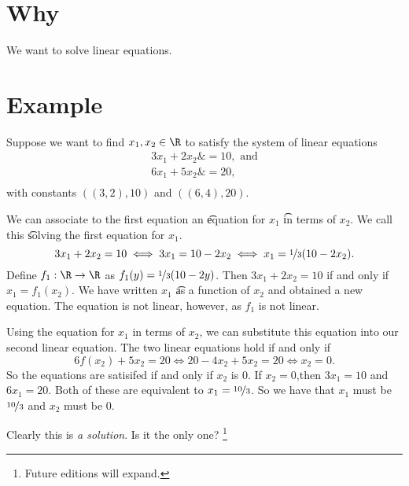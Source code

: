 
\section*{Why}

We want to solve linear equations.

\section*{Example}

Suppose we want to find $x_1, x_2 \in \R $ to satisfy the system of linear equations
  \[
\begin{aligned}
3x_1 + 2x_2 \&= 10, \text{ and} \\
6x_1 + 5x_2 \&= 20, \\
\end{aligned}
  \]
with constants $((3, 2), 10)$ and $((6, 4), 20)$.

We can associate to the first equation an \t{equation for} $x_1$ \t{in terms of} $x_2$.
We call this \t{solving the first equation for $x_1$}.
\[
3x_1 + 2x_2 = 10 \iff 3x_1 = 10 - 2x_2 \iff x_1 = \nicefrac{1}{3}(10 - 2x_2).
\]
Define $f_1: \R  \to \R $ as $f_1(y) = \nicefrac{1}{3}(10 - 2y)$.
Then $3x_1 + 2x_2 = 10$ if and only if $x_1 = f_1(x_2)$.
We have written $x_1$ \t{as a function} of $x_2$ and obtained a new equation.
The equation is not linear, however, as $f_1$ is not linear.

Using the equation for $x_1$ in terms of $x_2$, we can substitute this equation into our second linear equation.
The two linear equations hold if and only if
  \[
6f(x_2) + 5x_2 = 20 \iff 20 - 4x_2 + 5x_2 = 20 \iff x_2 = 0.
  \]
So the equations are satisifed if and only if $x_2$ is $0$.
If $x_2 = 0$,then $3x_1 = 10$ and $6x_1 = 20$.
Both of these are equivalent to $x_1 = \nicefrac{10}{3}$.
So we have that $x_1$ must be $\nicefrac{10}{3}$ and $x_2$ must be 0.

Clearly this is \textit{a solution}.
Is it the only one?
  \ifhmode\unskip\fi\footnote{
Future editions will expand.
  }

\blankpage